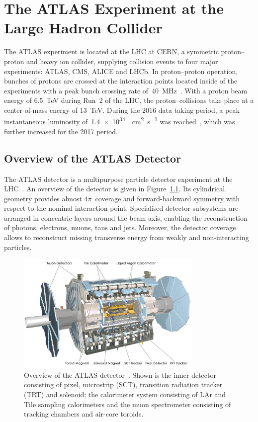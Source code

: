 \chapter{The ATLAS Experiment at the Large Hadron Collider}
\label{chap:atlas}

The ATLAS experiment is located at the LHC at CERN, a symmetric proton--proton
and heavy ion collider, supplying collision events to four major experiments:
ATLAS, CMS, ALICE and LHCb. In proton--proton operation, bunches of protons are
crossed at the interaction points located inside of the experiments with a peak
bunch crossing rate of~\SI{40}{\mega\hertz}~\cite{lhc}. With a proton beam
energy of \SI{6.5}{\TeV} during Run~2 of the LHC, the proton--collisions take
place at a center-of-mass energy of \SI{13}{\TeV}. During the 2016 data taking
period, a peak instantaneous luminosity
of~\SI{1.4e34}{\per\square\centi\metre\per\second} was
reached~\cite{lhc_2016_report}, which was further increased for the 2017 period.

\section{Overview of the ATLAS Detector}
\label{sec:atlas}

The ATLAS detector is a multipurpose particle detector experiment at the
LHC~\cite{atlas_detector}. An overview of the detector is given in
Figure~\ref{fig:atlas_detector}. Its cylindrical geometry provides almost
$4\pi$~coverage and forward-backward symmetry with respect to the nominal
interaction point. Specialised detector subsystems are arranged in concentric
layers around the beam axis, enabling the reconstruction of photons, electrons,
muons, taus and jets. Moreover, the detector coverage allows to reconstruct
missing transverse energy from weakly and non-interacting particles.

\begin{figure}[htb]
  \centering
  \includegraphics[width=0.8\textwidth]{./figures/atlas/overview.jpg}
  \caption{Overview of the ATLAS detector~\cite{atlas_detector}. Shown is the
    inner detector consisting of pixel, microstrip (SCT), transition radiation
    tracker (TRT) and solenoid; the calorimeter system consisting of LAr and
    Tile sampling calorimeters and the muon spectrometer consisting of tracking
    chambers and air-core toroids.}
  \label{fig:atlas_detector}
\end{figure}

